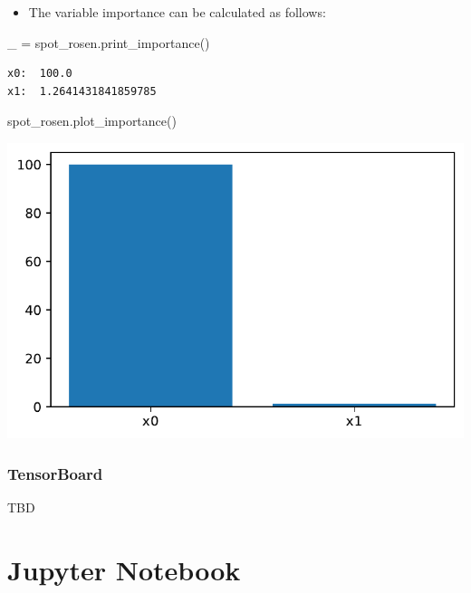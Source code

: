 \documentclass[
  letterpaper,
  DIV=11,
  numbers=noendperiod]{scrreprt}
\newenvironment{Shaded}{\begin{snugshade}}{\end{snugshade}}
\newcommand{\NormalTok}[1]{\textcolor[rgb]{0.00,0.23,0.31}{#1}}
\newcommand{\OperatorTok}[1]{\textcolor[rgb]{0.37,0.37,0.37}{#1}}
\providecommand{\tightlist}{%
  \setlength{\itemsep}{0pt}\setlength{\parskip}{0pt}}\usepackage{longtable,booktabs,array}
\begin{document}
\begin{itemize}
\tightlist
\item
  The variable importance can be calculated as follows:
\end{itemize}

\begin{Shaded}
\begin{Highlighting}[]
\NormalTok{\_ }\OperatorTok{=}\NormalTok{ spot\_rosen.print\_importance()}
\end{Highlighting}
\end{Shaded}

\begin{verbatim}
x0:  100.0
x1:  1.2641431841859785
\end{verbatim}

\begin{Shaded}
\begin{Highlighting}[]
\NormalTok{spot\_rosen.plot\_importance()}
\end{Highlighting}
\end{Shaded}

\includegraphics{008_num_spot_multidim_files/figure-pdf/cell-19-output-1.pdf}

\subsubsection{TensorBoard}\label{tensorboard-3}

TBD

\section{Jupyter Notebook}\label{jupyter-notebook-7}
\end{document}
